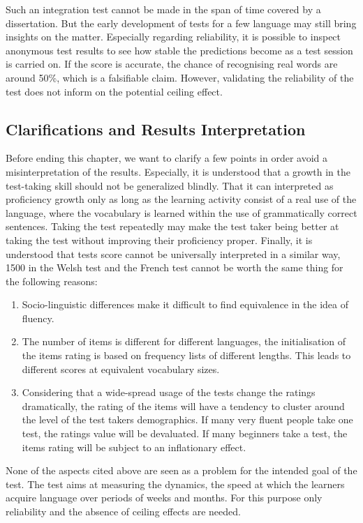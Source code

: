 Such an integration test cannot be made in the span of time covered by a dissertation. But the early development of tests for a few language may still bring insights on the matter. Especially regarding reliability, it is possible to inspect anonymous test results to see how stable the predictions become as a test session is carried on. If the score is accurate, the chance of recognising real words are around 50\%, which is a falsifiable claim. However, validating the reliability of the test does not inform on the potential ceiling effect.

\subsection{Clarifications and Results Interpretation}
Before ending this chapter, we want to clarify a few points in order avoid a misinterpretation of the results. Especially, it is understood that a growth in the test-taking skill should not be generalized blindly. That it can interpreted as proficiency growth only as long as the learning activity consist of a real use of the language, where the vocabulary is learned within the use of grammatically correct sentences. Taking the test repeatedly may make the test taker being better at taking the test without improving their proficiency proper. Finally, it is understood that tests score cannot be universally interpreted in a similar way, 1500 in the Welsh test and the French test cannot be worth the same thing for the following reasons:
\begin{enumerate}
  \item Socio-linguistic differences make it difficult to find equivalence in the idea of fluency.
  \item The number of items is different for different languages, the initialisation of the items rating is based on frequency lists of different lengths. This leads to different scores at equivalent vocabulary sizes.
  \item Considering that a wide-spread usage of the tests change the ratings dramatically, the rating of the items will have a tendency to cluster around the level of the test takers demographics. If many very fluent people take one test, the ratings value will be devaluated. If many beginners take a test, the items rating will be subject to an inflationary effect.
\end{enumerate}

None of the aspects cited above are seen as a problem for the intended goal of the test. The test aims at measuring the dynamics, the speed at which the learners acquire language over periods of weeks and months. For this purpose only reliability and the absence of ceiling effects are needed.

